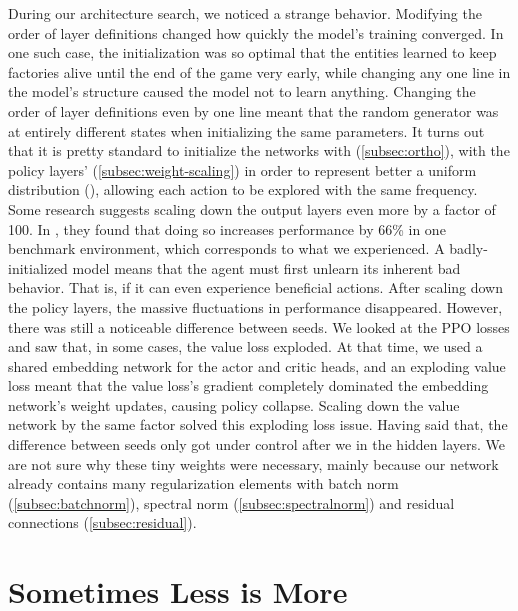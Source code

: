 \noindent During our architecture search, we noticed a strange behavior. Modifying the order of layer definitions changed how quickly the model's training converged. In one such case, the initialization was so optimal that the entities learned to keep factories alive until the end of the game very early, while changing any one line in the model's structure caused the model not to learn anything. Changing the order of layer definitions even by one line meant that the random generator was at entirely different states when initializing the same parameters. It turns out that it is pretty standard to initialize the networks with  (\autoref{subsec:ortho}), with the policy layers'  (\autoref{subsec:weight-scaling}) in order to represent better a uniform distribution (\cite{shengyi2022the37implementation}), allowing each action to be explored with the same frequency. Some research suggests scaling down the output layers even more by a factor of 100. In \cite{andrychowicz2020matters}, they found that doing so increases performance by 66\% in one benchmark environment, which corresponds to what we experienced. A badly-initialized model means that the agent must first unlearn its inherent bad behavior. That is, if it can even experience beneficial actions. After scaling down the policy layers, the massive fluctuations in performance disappeared. However, there was still a noticeable difference between seeds. We looked at the PPO losses and saw that, in some cases, the value loss exploded. At that time, we used a shared embedding network for the actor and critic heads, and an exploding value loss meant that the value loss's gradient completely dominated the embedding network's weight updates, causing policy collapse. Scaling down the value network by the same factor solved this exploding loss issue. Having said that, the difference between seeds only got under control after we  in the hidden layers. We are not sure why these tiny weights were necessary, mainly because our network already contains many regularization elements with batch norm (\autoref{subsec:batchnorm}), spectral norm (\autoref{subsec:spectralnorm}) and residual connections (\autoref{subsec:residual}).

\section{Sometimes Less is More}
\label{ch:disc-paying-for-performance}

